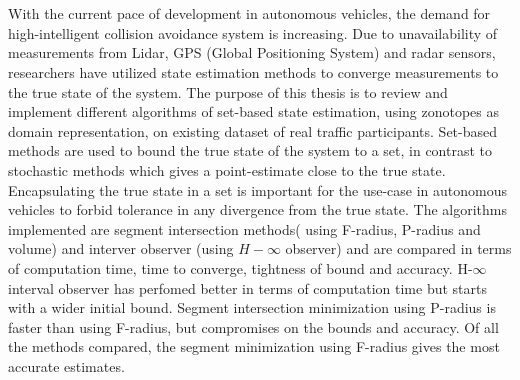\chapter{\abstractname}
With the current pace of development in autonomous vehicles, the demand for high-intelligent collision avoidance system is increasing. Due to unavailability of measurements from Lidar, GPS (Global Positioning System) and radar sensors, researchers have utilized state estimation methods to converge measurements to the true state of the system. The purpose of this thesis is to review and implement different algorithms of set-based state estimation, using zonotopes as domain representation, on existing dataset of real traffic participants. Set-based methods are used to bound the true state of the system to a set, in contrast to stochastic methods which gives a point-estimate close to the true state. Encapsulating the true state in a set is important for the use-case in autonomous vehicles to forbid tolerance in any divergence from the true state. The algorithms implemented are segment intersection methods( using F-radius, P-radius and volume) and interver observer (using $H-\infty$ observer) and are compared in terms of computation time, time to converge, tightness of bound and accuracy. H-$\infty$ interval observer has perfomed better in terms of computation time but starts with a wider initial bound. Segment intersection minimization using P-radius is faster than using F-radius, but compromises on the bounds and accuracy. Of all the methods compared, the segment minimization using F-radius gives the most accurate estimates.
